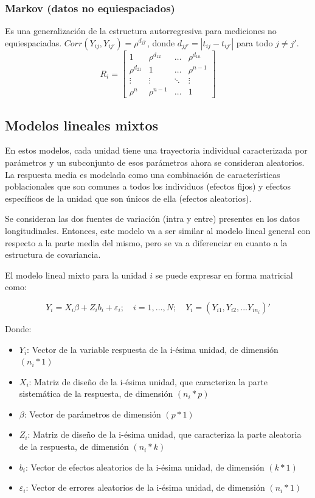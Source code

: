 \documentclass[spanish]{article}
\numberwithin{figure}{subsection}
\numberwithin{equation}{subsection}
\numberwithin{table}{subsection}
\begin{document}
\subsubsection{Markov (datos no equiespaciados)}

Es una generalización de la estructura autorregresiva para mediciones no equiespaciadas.
$Corr(Y_{ij}, Y_{ij'}) = \rho^{d_{jj'}}$, donde $d_{jj'} = |t_{ij} - t_{ij'}|$ para todo $j \neq j'$.
\[
R_i =
\begin{bmatrix}
	1      		  & \rho^{d_{12}} & \dots  & \rho^{d_{1n}} \\
	\rho^{d_{21}} & 1     		  & \dots  & \rho^{n-1} \\
	\vdots 		  & \vdots		  & \ddots & \vdots \\
	\rho^n 		  & \rho^{n-1}    & \dots  & 1
\end{bmatrix}
\]

\subsection{Modelos lineales mixtos}

En estos modelos, cada unidad tiene una trayectoria individual caracterizada por parámetros y un subconjunto de esos
parámetros ahora se consideran aleatorios. La respuesta media es modelada como una combinación de características
poblacionales que son comunes a todos los individuos (efectos fijos) y efectos específicos de la unidad que son únicos
de ella (efectos aleatorios).

Se consideran las dos fuentes de variación (intra y entre) presentes en los datos longitudinales. Entonces, este modelo
va a ser similar al modelo lineal general con respecto a la parte media del mismo, pero se va a diferenciar en cuanto
a la estructura de covariancia.

El modelo lineal mixto para la unidad $i$ se puede expresar en forma matricial como:

\[ Y_i = X_i\beta + Z_ib_i + \varepsilon_i; \quad i = 1, ..., N; \quad Y_i = (Y_{i1}, Y_{i2}, ... Y_{in_{i}})' \]

Donde:

\begin{itemize}
	\item $Y_i$: Vector de la variable respuesta de la i-ésima unidad, de dimensión $(n_i*1)$
	\item $X_i$: Matriz de diseño de la i-ésima unidad, que caracteriza la parte sistemática de la respuesta, de dimensión $(n_i*p)$
	\item $\beta$: Vector de parámetros de dimensión $(p*1)$
	\item $Z_i$: Matriz de diseño de la i-ésima unidad, que caracteriza la parte aleatoria de la respuesta, de dimensión $(n_i*k)$
	\item $b_i$: Vector de efectos aleatorios de la i-ésima unidad, de dimensión $(k*1)$
	\item $\varepsilon_i$: Vector de errores aleatorios de la i-ésima unidad, de dimensión $(n_i*1)$
\end{itemize}
\end{document}
